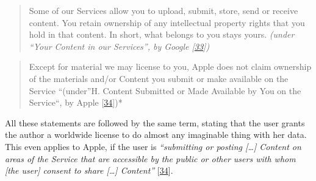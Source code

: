 \documentclass[12pt,english,a4paper,titlepage,cleardoublepage=empty,dottedtoc]{report}
\begin{document}
\begin{quote}
Some of our Services allow you to upload, submit, store, send or receive
content. You retain ownership of any intellectual property rights that
you hold in that content. In short, what belongs to you stays yours.
\emph{(under ``Your Content in our Services'', by Google
{[}\protect\hyperlink{ref-web_2016_google_terms-of-service}{33}{]})}
\end{quote}

\begin{quote}
Except for material we may license to you, Apple does not claim
ownership of the materials and/or Content you submit or make available
on the Service ``(under''H. Content Submitted or Made Available by You
on the Service``, by Apple
{[}\protect\hyperlink{ref-web_2016_apple-icloud_terms-of-service}{34}{]})*
\end{quote}

All these statements are followed by the same term, stating that the
user grants the author a worldwide license to do almost any imaginable
thing with her data. This even applies to Apple, if the user is
\emph{``submitting or posting {[}\ldots{}{]} Content on areas of the
Service that are accessible by the public or other users with whom
{[}the user{]} consent to share {[}\ldots{}{]} Content''}
{[}\protect\hyperlink{ref-web_2016_apple-icloud_terms-of-service}{34}{]}.
\end{document}
